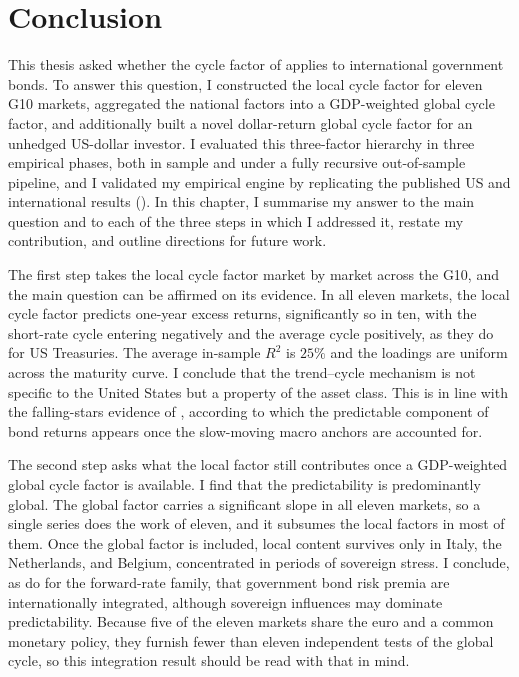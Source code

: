 \chapter{Conclusion}
\label{ch:conclusion}


This thesis asked whether the cycle factor of \citet{cieslak2015}
applies to international government bonds. To answer this question, I
constructed the local cycle factor for eleven G10 markets, aggregated the national factors into a GDP-weighted global
cycle factor, and additionally built a novel dollar-return global cycle factor
for an unhedged US-dollar investor. I evaluated this three-factor hierarchy
in three empirical phases, both in sample and under a fully recursive
out-of-sample pipeline, and I validated my empirical engine by replicating
the published US and international results (). In this
chapter, I summarise my answer to the main question and to each of the three
steps in which I addressed it, restate my contribution, and outline directions
for future work.

The first step takes the local cycle factor market by market across the G10, and
the main question can be affirmed on its evidence. In all eleven markets, the
local cycle factor predicts one-year excess returns, significantly so in ten,
with the short-rate cycle entering negatively and the average cycle
positively, as they do for US Treasuries. The average in-sample $R^{2}$ is
$25\%$ and the loadings are uniform across the maturity curve. I conclude that
the trend--cycle mechanism is not specific to the United States but a
property of the asset class. This is in line with the falling-stars evidence
of \citet{bauer2020}, according to which the predictable component of bond
returns appears once the slow-moving macro anchors are accounted for.

The second step asks what the local factor still contributes once a
GDP-weighted global cycle factor is available. I find that the predictability is
predominantly global. The global factor carries a significant slope in all
eleven markets, so a single series does the work of eleven, and it subsumes
the local factors in most of them. Once the global factor is
included, local content survives only in Italy, the Netherlands,
and Belgium, concentrated in periods of sovereign stress. I conclude, as
\citet{dahlquist2013} do for the forward-rate family, that government bond
risk premia are internationally
integrated, although sovereign influences may dominate predictability. Because
five of the eleven markets share the euro and a common monetary policy, they
furnish fewer than eleven independent tests of the global cycle, so this
integration result should be read with that in mind.

